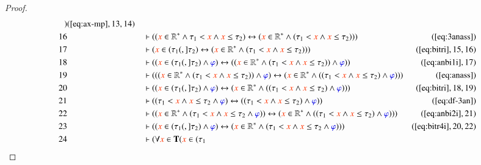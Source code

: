 \begin{proof}
\begin{align}
      )&(\mbox{\ref{eq:ax-mp}},13,14)\notag
  \\ 16 &&  & \vdash ( ( \msc{x} \in \mathbb{R}^{\ast} \wedge \tau_1 < \msc{x}
      \wedge \msc{x} \le \tau_2 ) \leftrightarrow ( \msc{x}
      \in \mathbb{R}^{\ast} \wedge ( \tau_1 < \msc{x} \wedge
      \msc{x} \le \tau_2 ) )
      )&(\mbox{\ref{eq:3anass}})\notag
  \\ 17 &&  & \vdash ( \msc{x} \in ( \tau_1 (,] \tau_2 ) \leftrightarrow (
      \msc{x} \in \mathbb{R}^{\ast} \wedge ( \tau_1 < \msc{x}
      \wedge \msc{x} \le \tau_2 ) )
      )&(\mbox{\ref{eq:bitri}},15,16)\notag
  \\ 18 &&  & \vdash ( ( \msc{x} \in ( \tau_1 (,] \tau_2 ) \wedge \mw{\varphi}
      ) \leftrightarrow ( ( \msc{x} \in \mathbb{R}^{\ast}
      \wedge ( \tau_1 < \msc{x} \wedge \msc{x} \le \tau_2 )
      ) \wedge \mw{\varphi} )
      )&(\mbox{\ref{eq:anbi1i}},17)\notag
  \\ 19 &&  & \vdash ( ( ( \msc{x} \in \mathbb{R}^{\ast} \wedge ( \tau_1 < \msc{x}
      \wedge \msc{x} \le \tau_2 ) ) \wedge \mw{\varphi} )
      \leftrightarrow ( \msc{x} \in \mathbb{R}^{\ast} \wedge (
      ( \tau_1 < \msc{x} \wedge \msc{x} \le \tau_2 ) \wedge
      \mw{\varphi} ) ) )&(\mbox{\ref{eq:anass}})\notag
  \\ 20 &&  & \vdash ( ( \msc{x} \in ( \tau_1 (,] \tau_2 ) \wedge \mw{\varphi}
      ) \leftrightarrow ( \msc{x} \in \mathbb{R}^{\ast} \wedge
      ( ( \tau_1 < \msc{x} \wedge \msc{x} \le \tau_2 )
      \wedge \mw{\varphi} ) )
      )&(\mbox{\ref{eq:bitri}},18,19)\notag
  \\ 21 &&  & \vdash ( ( \tau_1 < \msc{x} \wedge \msc{x} \le \tau_2 \wedge
      \mw{\varphi} ) \leftrightarrow ( ( \tau_1 < \msc{x}
      \wedge \msc{x} \le \tau_2 ) \wedge \mw{\varphi} )
      )&(\mbox{\ref{eq:df-3an}})\notag
  \\ 22 &&  & \vdash ( ( \msc{x} \in \mathbb{R}^{\ast} \wedge ( \tau_1 < \msc{x}
      \wedge \msc{x} \le \tau_2 \wedge \mw{\varphi} ) )
      \leftrightarrow ( \msc{x} \in \mathbb{R}^{\ast} \wedge (
      ( \tau_1 < \msc{x} \wedge \msc{x} \le \tau_2 ) \wedge
      \mw{\varphi} ) ) )&(\mbox{\ref{eq:anbi2i}},21)\notag
  \\ 23 &&  & \vdash ( ( \msc{x} \in ( \tau_1 (,] \tau_2 ) \wedge \mw{\varphi}
      ) \leftrightarrow ( \msc{x} \in \mathbb{R}^{\ast} \wedge
      ( \tau_1 < \msc{x} \wedge \msc{x} \le \tau_2 \wedge
      \mw{\varphi} ) )
      )&(\mbox{\ref{eq:bitr4i}},20,22)\notag
  \\ 24 &&  & \vdash ( \forall \msc{x} \in \mathbf{T} ( \msc{x} \in ( \tau_1

\end{align}
\end{proof}
